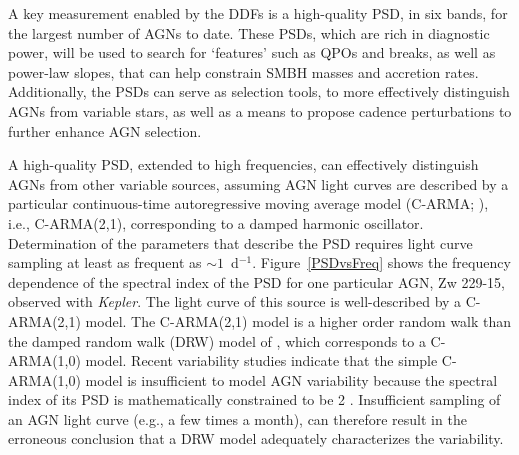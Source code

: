 A key measurement enabled by the DDFs is a high-quality PSD, in six bands,
for the largest number of AGNs to date. These PSDs, which are rich
in diagnostic power, will be used to search for `features' such as QPOs
and breaks, as well as power-law slopes, that can help constrain SMBH masses
and accretion rates. Additionally, the PSDs can serve as selection
tools, to more effectively distinguish AGNs from variable stars, as
well as a means to propose cadence perturbations to further enhance
AGN selection.

A high-quality PSD, extended to high frequencies, can effectively distinguish
AGNs from other variable sources, assuming AGN light curves are described by
a particular continuous-time autoregressive moving average model (C-ARMA;
\citet{KellyEtal2014}), i.e., C-ARMA(2,1), corresponding to a damped harmonic
oscillator.
%
Determination of the parameters that describe the PSD requires light curve
sampling at least as frequent as $\sim1$~d$^{-1}$. Figure~\ref{PSDvsFreq} shows
the frequency dependence of the spectral index of the PSD for one particular AGN, 
Zw 229-15, observed with {\em Kepler}. The light curve of this source is
well-described by a C-ARMA(2,1) model. The C-ARMA(2,1) model is a higher order
random walk than the damped random walk (DRW) model of \citet{Kelly09}, which
corresponds to a C-ARMA(1,0) model. Recent variability studies indicate that
the simple C-ARMA(1,0) model is insufficient to model AGN variability because
the spectral index of its PSD is mathematically constrained to be 2
\citep{Kelly14,Kasliwal15,Simm15}. Insufficient sampling of an AGN light
curve (e.g., a few times a month), can therefore result in the erroneous conclusion
that a DRW model adequately characterizes the variability.


